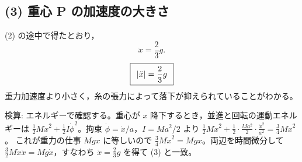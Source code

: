 \documentclass[11pt,a4paper]{article}
\begin{document}
\subsection*{(3) 重心 P の加速度の大きさ}
(2) の途中で得たとおり，
\[
  \ddot{x}=\frac{2}{3}g.
\]
\[
  \boxed{\,\;|\ddot{x}|=\dfrac{2}{3}g\;\,}
\]
重力加速度より小さく，糸の張力によって落下が抑えられていることがわかる。

\medskip
検算: エネルギーで確認する。重心が $x$ 降下するとき，並進と回転の運動エネルギーは
$\frac12 M\dot x^2+\frac12 I\dot\phi^2$。拘束 $\dot\phi=\dot x/a$，$I=Ma^2/2$ より
$\frac12 M\dot x^2+\frac12\cdot\frac{Ma^2}{2}\cdot\frac{\dot x^2}{a^2}
=\frac34 M\dot x^2$。
これが重力の仕事 $Mgx$ に等しいので $\frac34 M\dot x^2=Mgx$。両辺を時間微分して
$\frac32 M\dot x\ddot x=Mg\dot x$，すなわち $\ddot x=\frac23 g$ を得て (3) と一致。\checkmark
\end{document}
